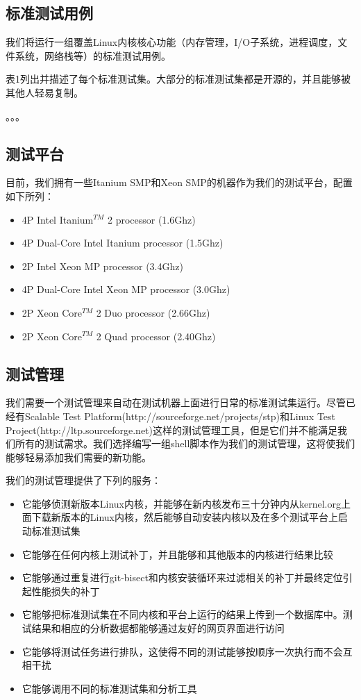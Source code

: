 \documentclass[CJK,12pt,a4paper]{article}
\begin{document}
\subsection{标准测试用例}
我们将运行一组覆盖Linux内核核心功能（内存管理，I/O子系统，进程调度，文件系统，网络栈等）的标准测试用例。

表1列出并描述了每个标准测试集。大部分的标准测试集都是开源的，并且能够被其他人轻易复制。

。。。
\subsection{测试平台}
目前，我们拥有一些Itanium SMP和Xeon SMP的机器作为我们的测试平台，配置如下所列：

\begin{itemize}
\item 4P Intel Itanium$^{TM}$ 2 processor (1.6Ghz)
\item 4P Dual-Core Intel Itanium processor (1.5Ghz) 
\item 2P Intel Xeon MP processor (3.4Ghz)
\item 4P Dual-Core Intel Xeon MP processor (3.0Ghz) 
\item 2P Xeon Core$^{TM}$ 2 Duo processor (2.66Ghz)
\item 2P Xeon Core$^{TM}$ 2 Quad processor (2.40Ghz)
\end{itemize}
\subsection{测试管理}
我们需要一个测试管理来自动在测试机器上面进行日常的标准测试集运行。尽管已经有Scalable Test Platform(http://sourceforge.net/projects/stp)和Linux Test Project(http://ltp.sourceforge.net)这样的测试管理工具，但是它们并不能满足我们所有的测试需求。我们选择编写一组shell脚本作为我们的测试管理，这将使我们能够轻易添加我们需要的新功能。

我们的测试管理提供了下列的服务：
\begin{itemize}
\item 它能够侦测新版本Linux内核，并能够在新内核发布三十分钟内从kernel.org上面下载新版本的Linux内核，然后能够自动安装内核以及在多个测试平台上启动标准测试集
\item 它能够在任何内核上测试补丁，并且能够和其他版本的内核进行结果比较
\item 它能够通过重复进行git-bisect和内核安装循环来过滤相关的补丁并最终定位引起性能损失的补丁
\item 它能够把标准测试集在不同内核和平台上运行的结果上传到一个数据库中。测试结果和相应的分析数据都能够通过友好的网页界面进行访问
\item 它能够将测试任务进行排队，这使得不同的测试能够按顺序一次执行而不会互相干扰
\item 它能够调用不同的标准测试集和分析工具
\end{itemize}
\end{document}
